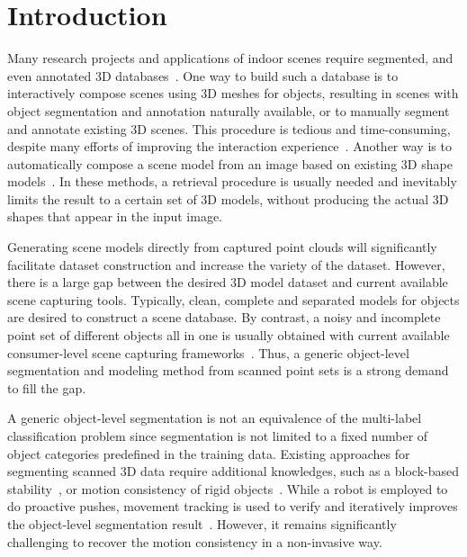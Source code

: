 \section{Introduction}
\label{sec:intro}
Many research projects and applications of indoor scenes require segmented, and even annotated 3D databases~\cite{SearchClassify,SceneFromExample,Fisher:2012:ESO:2366145.2366154,Chen:2014:ASM:2661229.2661239,Fisher:ActivityCentricSceneSynthesis}.
%
One way to build such a database is to interactively compose scenes using 3D meshes for objects, resulting in scenes with object segmentation and annotation naturally available, or to manually segment and annotate existing 3D scenes. This procedure is tedious and time-consuming, despite many efforts of improving the interaction experience~\cite{Merrell:2011:IFL:2010324.1964982,Xu:2013:SSC:2461912.2461968}. 
%
Another way is to automatically compose a scene model from an image based on existing 3D shape models~\cite{Liu2015Model,Chen:2014:ASM:2661229.2661239}.  
In these methods, a retrieval procedure is usually needed and inevitably limits the result to a certain set of 3D models, without producing the actual 3D shapes that appear in the input image.

Generating scene models directly from captured point clouds will significantly facilitate dataset construction and increase the variety of the dataset. 
However, there is a large gap between the desired 3D model dataset and current available scene capturing tools. Typically, clean, complete and separated models for objects are desired to construct a scene database. 
By contrast, a noisy and incomplete point set of different objects all in one is usually obtained with current available consumer-level scene capturing frameworks~\cite{KinectFusion,VXH,dai2016bundlefusion}. 
Thus, a generic object-level segmentation and modeling method from scanned point sets is a strong demand to fill the gap.

A generic object-level segmentation is not an equivalence of the multi-label classification problem since segmentation is not limited to a fixed number of object categories predefined in the training data. 
Existing approaches for segmenting scanned 3D data require additional knowledges, such as a block-based stability~\cite{3DReasoningfromBlockstoStability}, or motion consistency of rigid objects~\cite{Xu:2015:ACS:2816795.2818075}. 
While a robot is employed to do proactive pushes, movement tracking is used to verify and iteratively improves the object-level segmentation result~\cite{Xu:2015:ACS:2816795.2818075}.
However, it remains significantly challenging to recover the motion consistency in a non-invasive way. 

